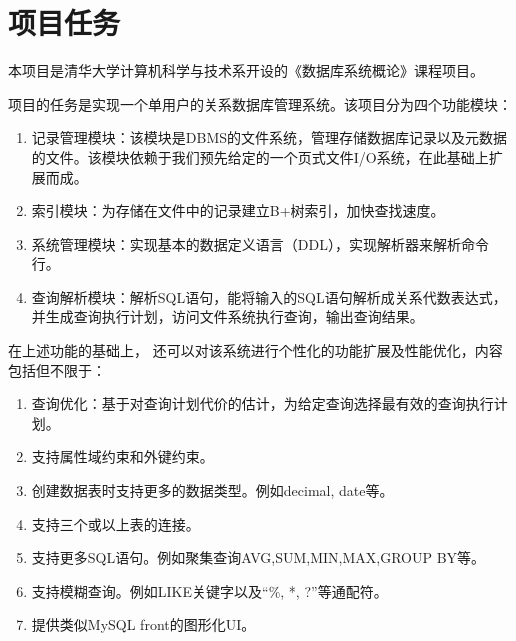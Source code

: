 
\chapter{项目任务} %

\label{Chapter1} %


\newcommand{\keyword}[1]{\textbf{#1}}
\newcommand{\tabhead}[1]{\textbf{#1}}
\newcommand{\code}[1]{\texttt{#1}}
\newcommand{\file}[1]{\texttt{\bfseries#1}}
\newcommand{\option}[1]{\texttt{\itshape#1}}

本项目是清华大学计算机科学与技术系开设的《数据库系统概论》课程项目。

项目的任务是实现一个单用户的关系数据库管理系统。该项目分为四个功能模块：
\begin{enumerate}[(1)]
\item 记录管理模块：该模块是DBMS的文件系统，管理存储数据库记录以及元数据的文件。该模块依赖于我们预先给定的一个页式文件I/O系统，在此基础上扩展而成。
\item 索引模块：为存储在文件中的记录建立B+树索引，加快查找速度。
\item 系统管理模块：实现基本的数据定义语言（DDL），实现解析器来解析命令行。
\item 查询解析模块：解析SQL语句，能将输入的SQL语句解析成关系代数表达式，并生成查询执行计划，访问文件系统执行查询，输出查询结果。
\end{enumerate}

在上述功能的基础上， 还可以对该系统进行个性化的功能扩展及性能优化，内容包括但不限于：
\begin{enumerate}[(1)] 
\item 查询优化：基于对查询计划代价的估计，为给定查询选择最有效的查询执行计划。
\item 支持属性域约束和外键约束。
\item 创建数据表时支持更多的数据类型。例如decimal, date等。
\item 支持三个或以上表的连接。
\item 支持更多SQL语句。例如聚集查询AVG,SUM,MIN,MAX,GROUP BY等。
\item 支持模糊查询。例如LIKE关键字以及“$\%$, *, ?”等通配符。
\item 提供类似MySQL front的图形化UI。
\end{enumerate}



